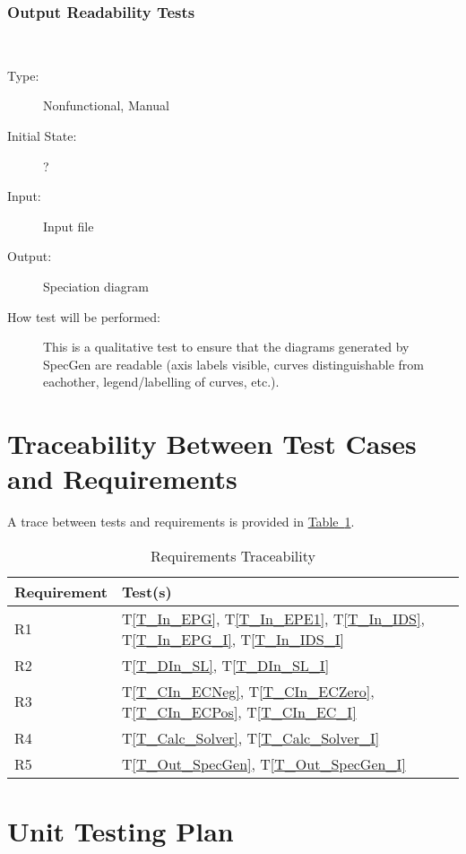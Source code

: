 \documentclass[12pt, titlepage]{article}
\newcommand{\progname}{SpecGen}
\newcounter{testnum} %
\newcommand{\testref}[1]{T\ref{#1}}
\begin{document}
\subsubsection{Output Readability Tests}
		
\noindent {\bf }
\begin{addmargin}[2em]{0em}
\\
\begin{addmargin}[2em]{0em}
\begin{description}
\item[Type:] Nonfunctional, Manual
					
\item[Initial State:] ?
					
\item[Input:] Input file
					
\item[Output:] Speciation diagram
					
\item[How test will be performed:] This is a qualitative test to ensure that the 
diagrams generated by \progname{} are readable (axis labels visible, curves 
distinguishable from eachother, legend/labelling of curves, etc.).\\
\end{description}
\end{addmargin}

\end{addmargin}

\newpage
\section{Traceability Between Test Cases and Requirements}
A trace between tests and requirements is provided in 
\hyperref[tab:reqtrace]{Table~\ref*{tab:reqtrace}}.

\begin{table}[h]
\caption{Requirements Traceability} \label{tab:reqtrace}
\centering
\begin{tabularx}{0.55\textwidth}{p{4cm}X}
\toprule {\bf Requirement} & {\bf Test(s)}\\
\midrule
R1	&	\testref{T_In_EPG}, \testref{T_In_EPE1}, \testref{T_In_IDS}, 
      \testref{T_In_EPG_I}, \testref{T_In_IDS_I}\\
R2	&	\testref{T_DIn_SL}, \testref{T_DIn_SL_I}\\
R3	&	\testref{T_CIn_ECNeg}, \testref{T_CIn_ECZero}, \testref{T_CIn_ECPos}, 
      \testref{T_CIn_EC_I}\\
R4	&	\testref{T_Calc_Solver}, \testref{T_Calc_Solver_I}\\
R5	&	\testref{T_Out_SpecGen}, \testref{T_Out_SpecGen_I}\\
\bottomrule
\end{tabularx}
\end{table}

				
\section{Unit Testing Plan}
		
  




\end{document}
